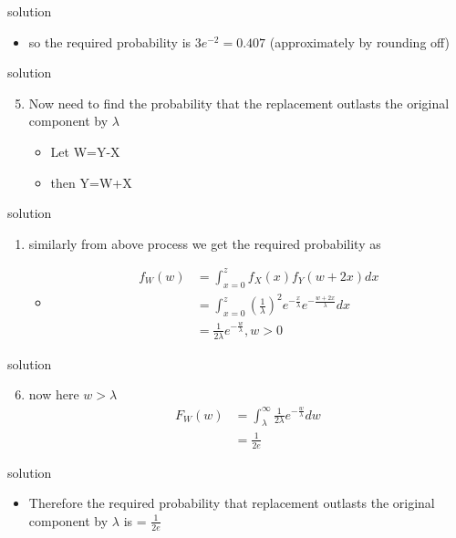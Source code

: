 \documentclass{beamer}
\begin{document}
    
\begin{frame}{solution}
    \begin{itemize}
       \item so the required probability is $3e^{-2}=0.407$ (approximately by rounding off)
    \end{itemize}   
\end{frame}


\begin{frame}{solution}
\begin{enumerate}
\setcounter{enumi}{4}
\item Now need to find the probability that the replacement outlasts the original component by $\lambda$
\begin{itemize}
    \item Let W=Y-X
    \item then Y=W+X
    \end{itemize}
    \end{enumerate}
    \end{frame}
    
    
\begin{frame}{solution}
    \begin{enumerate}
        \item  similarly from above process we get the required probability as
        \begin{itemize}
       \item
    \begin{align}
     f_{W}(w) & = \int_{x=0}^{z}f_{X}(x)f_{Y}(w+2x)dx\\
              & = \int_{x=0}^{z}({\frac{1}{\lambda}})^2e^{-\frac{x}{\lambda}}e^{-\frac{w+2x}{\lambda}}dx\\ 
              & = \frac{1}{2\lambda}e^{-\frac{w}{\lambda}},{   w>0}
    \end{align}
\end{itemize}
\end{enumerate}
\end{frame}


\begin{frame}{solution}
\begin{enumerate}
\setcounter{enumi}{5}
\item now here $w>\lambda$ 
\begin{align}
F_{W}(w) & = \int_{\lambda}^{\infty}\frac{1}{2\lambda}e^{-\frac{w}{\lambda}}dw\\
         & = \frac{1}{2e}
\end{align}

\end{enumerate}
\end{frame}


\begin{frame}{solution}
\begin{itemize}
    \item Therefore the required probability that replacement outlasts the original component by $\lambda$ is = $\frac{1}{2e}$
\end{itemize}
\end{frame}
\end{document}
